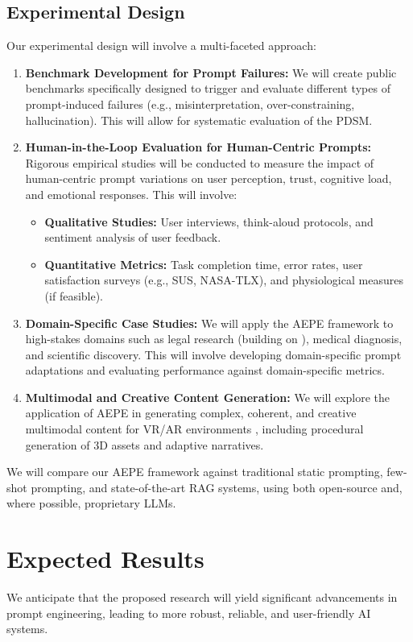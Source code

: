 \documentclass{article}
\begin{document}
\subsection{Experimental Design}
Our experimental design will involve a multi-faceted approach:
\begin{enumerate}[label=\arabic*.]
    \item \textbf{Benchmark Development for Prompt Failures:} We will create public benchmarks specifically designed to trigger and evaluate different types of prompt-induced failures (e.g., misinterpretation, over-constraining, hallucination). This will allow for systematic evaluation of the PDSM.
    \item \textbf{Human-in-the-Loop Evaluation for Human-Centric Prompts:} Rigorous empirical studies will be conducted to measure the impact of human-centric prompt variations on user perception, trust, cognitive load, and emotional responses. This will involve:
    \begin{itemize}
        \item \textbf{Qualitative Studies:} User interviews, think-aloud protocols, and sentiment analysis of user feedback.
        \item \textbf{Quantitative Metrics:} Task completion time, error rates, user satisfaction surveys (e.g., SUS, NASA-TLX), and physiological measures (if feasible).
    \end{itemize}
    \item \textbf{Domain-Specific Case Studies:} We will apply the AEPE framework to high-stakes domains such as legal research (building on \cite{paper5}), medical diagnosis, and scientific discovery. This will involve developing domain-specific prompt adaptations and evaluating performance against domain-specific metrics.
    \item \textbf{Multimodal and Creative Content Generation:} We will explore the application of AEPE in generating complex, coherent, and creative multimodal content for VR/AR environments \cite{paper4}, including procedural generation of 3D assets and adaptive narratives.
\end{enumerate}
We will compare our AEPE framework against traditional static prompting, few-shot prompting, and state-of-the-art RAG systems, using both open-source and, where possible, proprietary LLMs.

\section{Expected Results}
We anticipate that the proposed research will yield significant advancements in prompt engineering, leading to more robust, reliable, and user-friendly AI systems.
\end{document}
